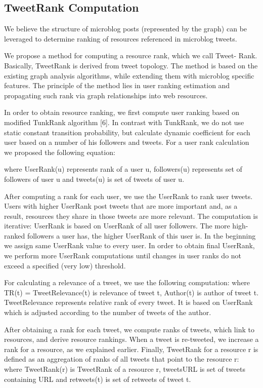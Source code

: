 \documentclass[]{article}
\begin{document}
\subsection {TweetRank Computation}
We believe the structure of microblog posts (represented by the graph) can be
leveraged to determine ranking of resources referenced in microblog tweets.

We propose a method for computing a resource rank, which we call Tweet-
Rank. Basically, TweetRank is derived from tweet topology. The method is based
on the existing graph analysis algorithms, while extending them with microblog
specific features. The principle of the method lies in user ranking estimation and
propagating such rank via graph relationships into web resources.

In order to obtain resource ranking, we first compute user ranking based on
modified TunkRank algorithm [6]. In contrast with TunkRank, we do not use
static constant transition probability, but calculate dynamic coefficient for each
user based on a number of his followers and tweets. For a user rank calculation
we proposed the following equation:

where UserRank(u) represents rank of a user u, followers(u) represents set of
followers of user u and tweets(u) is set of tweets of user u.

After computing a rank for each user, we use the UserRank to rank user
tweets. Users with higher UserRank post tweets that are more important and, as
a result, resources they share in those tweets are more relevant. The computation
is iterative: UserRank is based on UserRank of all user followers. The more
high-ranked followers a user has, the higher UserRank of this user is. In the
beginning we assign same UserRank value to every user. In order to obtain
final UserRank, we perform more UserRank computations until changes in
user ranks do not exceed a specified (very low) threshold.

For calculating a relevance of a tweet, we use the following computation:
where TR(t) = TweetRelevance(t) is relevance of tweet t, Author(t) is author
of tweet t. TweetRelevance represents relative rank of every tweet. It is based
on UserRank which is adjusted according to the number of tweets of the author.

After obtaining a rank for each tweet, we compute ranks of tweets, which
link to resources, and derive resource rankings. When a tweet is re-tweeted, we
increase a rank for a resource, as we explained earlier. Finally, TweetRank for
a resource r is defined as an aggregation of ranks of all tweets that point to the
resource r:
where TweetRank(r) is TweetRank of a resource r, tweetsURL is set of tweets
containing URL and retweets(t) is set of retweets of tweet t.
\end{document}

